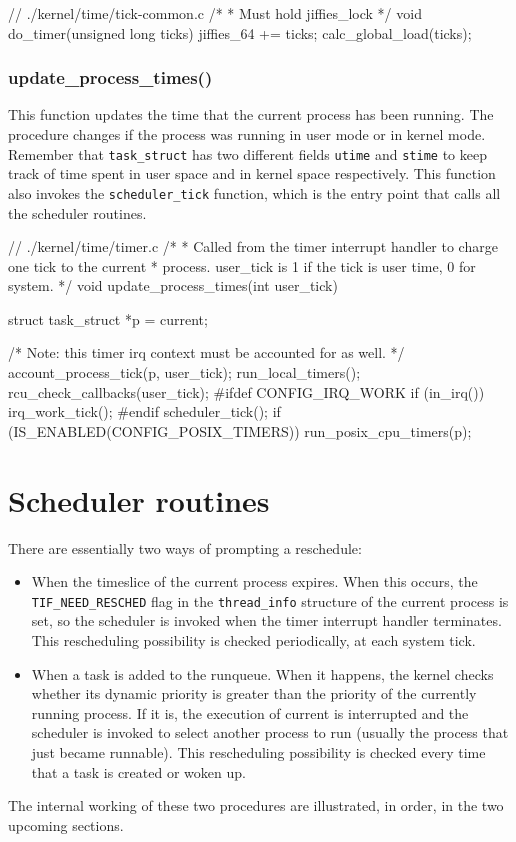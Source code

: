 \begin{code}
// ./kernel/time/tick-common.c
/*
 * Must hold jiffies_lock
 */
void do_timer(unsigned long ticks)
{
	jiffies_64 += ticks;
	calc_global_load(ticks);
}
\end{code}

\subsubsection{update\_process\_times()}
This function updates the time that the current process has been running. The procedure changes if the process was running in user mode or in kernel mode. Remember that \verb|task_struct| has two different fields \verb|utime| and \verb|stime| to keep track of time spent in user space and in kernel space respectively. This function also invokes the \verb|scheduler_tick| function, which is the entry point that calls all the scheduler routines.

\begin{code}
// ./kernel/time/timer.c
/*
 * Called from the timer interrupt handler to charge one tick to the current
 * process.  user_tick is 1 if the tick is user time, 0 for system.
 */
void update_process_times(int user_tick)
{
	struct task_struct *p = current;

	/* Note: this timer irq context must be accounted for as well. */
	account_process_tick(p, user_tick);
	run_local_timers();
	rcu_check_callbacks(user_tick);
#ifdef CONFIG_IRQ_WORK
	if (in_irq())
		irq_work_tick();
#endif
	scheduler_tick();
	if (IS_ENABLED(CONFIG_POSIX_TIMERS))
		run_posix_cpu_timers(p);
}
\end{code}

\section{Scheduler routines}
There are essentially two ways of prompting a reschedule:
\begin{itemize}
    \item When the timeslice of the current process expires. When this occurs, the \verb|TIF_NEED_RESCHED|
    flag in the \verb|thread_info| structure of the current process is set, so the scheduler is
    invoked when the timer interrupt handler terminates.\cite{cesati} This rescheduling possibility is checked periodically, at each system tick.
    \item When a task is added to the runqueue. When it happens, the kernel checks whether its dynamic priority is
    greater than the priority of the currently running process. If it is, the execution of
    current is interrupted and the scheduler is invoked to select another process to run
    (usually the process that just became runnable).\cite{cesati} This rescheduling possibility is checked every time that a task is created or woken up.
\end{itemize}
The internal working of these two procedures are illustrated, in order, in the two upcoming sections.

